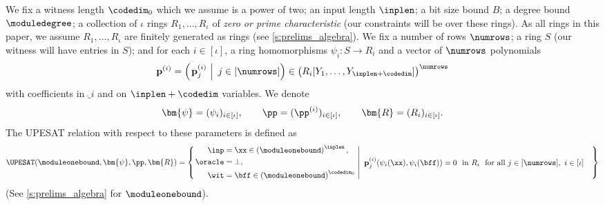 We fix a witness length $\codedim_0$ which we assume is a power of two; an input length $\inplen$; a bit size bound $B$; a degree bound $\moduledegree$; a collection of $\iota$ rings $R_1, \ldots, R_{\iota}$ of \emph{zero or prime characteristic} (our constraints will be over these rings). As all rings in this paper, we assume $R_1, \ldots, R_\iota$ are finitely generated as rings (see \cref{s:prelims_algebra}). We fix a number of rows $\numrows$; a ring $S$ (our witness will have entries in $S$); and for each $i\in [\iota]$, a   ring homomorphisms $\psi_i: S\to R_i$ and a  vector of $\numrows$ polynomials
$$\mathbf{p}^{(i)} = \left(\left.\mathbf{p}_{j}^{(i)} \ \right| \ j\in[\numrows]\right) \in \left(R_i[Y_1,\ldots, Y_{\inplen+\codedim}]\right)^{\numrows}$$ with coefficients in $\ring_i$ and on $\inplen + \codedim$ variables. %
We denote $$\bm{\psi}=(\psi_i)_{i\in [\iota]},\qquad \pp = (\pp^{(i)})_{i\in [\iota]}, \qquad \bm{R}=(R_i)_{i\in[\iota]}.$$ 
%
The UPESAT relation with respect to these parameters is defined as
$$
\UPESAT(\moduleonebound, \bm{\psi}, \pp,\bm{R}) 
= \left\{\left. 
\begin{aligned}
    \inp &= \xx \in \left(\moduleonebound\right)^{\inplen},\\
    \oracle &=\bot,\\
    \wit &=\bff \in \left(\moduleonebound\right)^{\codedim_0}
\end{aligned} 
\ \right| \ 
\begin{aligned}
    &\mathbf{p}_{j}^{(i)}(\psi_i(\xx), \psi_i(\bff)) = 0 \ \text{ in } R_i \ \text{ for all } j\in [\numrows], \ i \in [\iota]
\end{aligned}
\right\}
$$
(See \cref{s:prelims_algebra} for $\moduleonebound$). 

